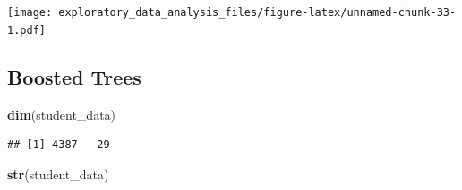 \documentclass[
]{article}
\newenvironment{Shaded}{\begin{snugshade}}{\end{snugshade}}
\newcommand{\FunctionTok}[1]{\textcolor[rgb]{0.13,0.29,0.53}{\textbf{#1}}}
\newcommand{\NormalTok}[1]{#1}
\begin{document}
\texttt{[image: exploratory\_data\_analysis\_files/figure-latex/unnamed-chunk-33-1.pdf]}

\hypertarget{boosted-trees}{%
\subsection{Boosted Trees}\label{boosted-trees}}

\begin{Shaded}
\begin{Highlighting}[]
\FunctionTok{dim}\NormalTok{(student\_data)}
\end{Highlighting}
\end{Shaded}

\begin{verbatim}
## [1] 4387   29
\end{verbatim}

\begin{Shaded}
\begin{Highlighting}[]
\FunctionTok{str}\NormalTok{(student\_data)}
\end{Highlighting}
\end{Shaded}
\end{document}
